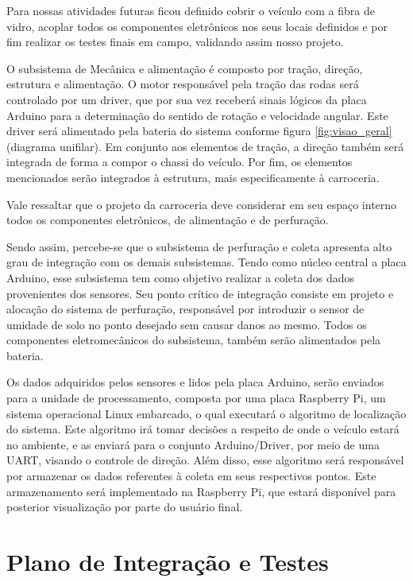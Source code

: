 Para nossas atividades futuras ficou definido cobrir o veículo com a fibra de vidro, acoplar todos os componentes eletrônicos nos seus locais definidos e por fim realizar os testes finais em campo, validando assim nosso projeto.

O subsistema de Mecânica e alimentação é composto por tração, direção, estrutura e alimentação. O motor
responsável pela tração das rodas será controlado por um driver, que por sua vez receberá sinais lógicos da placa Arduino
para a determinação do sentido de rotação e velocidade angular. Este driver será alimentado pela bateria do sistema conforme
figura \ref{fig:visao_geral} (diagrama unifilar). Em conjunto aos elementos de tração, a direção também será integrada de forma
a compor o chassi do veículo. Por fim, os elementos mencionados serão integrados à estrutura, mais especificamente à carroceria.

Vale ressaltar que o projeto da carroceria deve considerar em seu espaço interno todos os componentes eletrônicos, de
alimentação e de perfuração.

Sendo assim, percebe-se que o subsistema de perfuração e coleta apresenta alto grau de integração com os demais subsistemas.
Tendo como núcleo central a placa Arduino, esse subsistema tem como objetivo realizar a coleta dos dados provenientes dos
sensores. Seu ponto crítico de integração consiste em projeto e alocação do sistema de perfuração, responsável por introduzir
o sensor de umidade de solo no ponto desejado sem causar danos ao mesmo. Todos os componentes eletromecânicos do subsistema,
também serão alimentados pela bateria.


Os dados adquiridos pelos sensores e lidos pela placa Arduino, serão enviados para a unidade de processamento, composta por
uma placa Raspberry Pi, um sistema operacional Linux embarcado, o qual executará o algoritmo de localização do sistema. Este
algoritmo irá tomar decisões a respeito de onde o veículo estará no ambiente, e as enviará para o conjunto Arduino/Driver, por meio de uma UART, visando o controle de
direção. Além disso, esse algoritmo será responsável por armazenar os dados referentes à coleta em seus respectivos
pontos. Este armazenamento será implementado na Raspberry Pi, que estará disponível para posterior visualização por
parte do usuário final.

\chapter{Plano de Integração e Testes}

